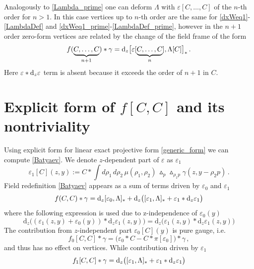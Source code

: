 \documentclass[12pt]{article}
\newcommand{\dr}{{{\rm d}}}
\newcommand{\hmt}{\vartriangle}
\begin{document}
Analogously to \eqref{Lambda_prime} one can deform $\Lambda$ with $\varepsilon[C,\ldots,C]$ of the $n$-th order for $n>1$. In this case vertices up to $n$-th order are the same for \eqref{dxWeq1}-\eqref{LambdaDef} and \eqref{dxWeq1_prime}-\eqref{LambdaDef_prime}, however in the $n+1$ order zero-form vertices are related by the change of the field frame of the form
\begin{equation}\label{N+1}
f(\underbrace{C,\ldots,C}_{n+1})\ast \gamma=\dr_z\big[\varepsilon[\underbrace{C,\ldots,C}_n],\Lambda[C]\big]_\ast\,.
\end{equation}
Here $\varepsilon\ast\dr_z \varepsilon$ term is absent because it exceeds the order  of $n+1$ in $C$. 

\section{Explicit form of $f[C,C]$ and its nontriviality}\label{Explicit_f}
Using explicit form for linear exact projective form \eqref{generic_form} we can compute \eqref{Batyaev}. We denote $z$-dependent part of $\varepsilon$ as $\varepsilon_1$
\begin{equation}\label{varepsilon_1}
\varepsilon_1[C](z,y):=C\ast \int d\rho_1\, d\rho_2\, \mu(\rho_1,\rho_2)\, \hmt_p\hmt_{\rho_1 p}\gamma(z,y-\rho_2 p)\,.
\end{equation} 
Field redefinition \eqref{Batyaev} appears as a sum of terms driven by $\varepsilon_0$ and $\varepsilon_1$
\begin{equation}
f(C,C)\ast \gamma=\dr_z[\varepsilon_0,\Lambda]_\ast+\dr_z\big([\varepsilon_1,\Lambda]_\ast+\varepsilon_1\ast \dr_z \varepsilon_1\big)
\end{equation}
where the following expression is used due to z-independence of $\varepsilon_0(y)$
\begin{equation}
\mathrm{d}_z\big((\varepsilon_1(z,y)+\varepsilon_0(y))*\mathrm{d}_z \varepsilon_1(z,y)     \big)=\mathrm{d}_z\big(\varepsilon_1(z,y)*\mathrm{d}_z \varepsilon_1(z,y)\big)
\end{equation}
The contribution from $z$-independent part $\varepsilon_0[C](y)$ is pure gauge, i.e.
\begin{equation}\label{twisted_commutator}
f_0[C,C]\ast \gamma=\big(\varepsilon_0\ast C-C\ast \pi[\varepsilon_0]\big)\ast \gamma\,,
\end{equation}
and thus has no effect on vertices. While contribution driven by $\varepsilon_1$
\begin{equation}
f_1[C,C]\ast \gamma=\dr_z\big([\varepsilon_1,\Lambda]_\ast+\varepsilon_1\ast \dr_z \varepsilon_1\big)
\end{equation}
\end{document}
